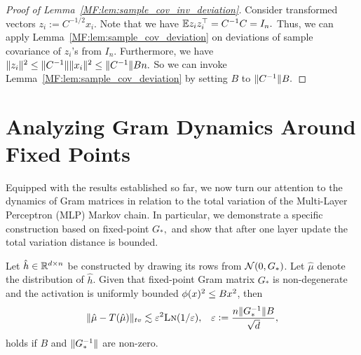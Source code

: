 \begin{proof}[Proof of Lemma~\ref{MF:lem:sample_cov_inv_deviation}]
Consider transformed vectors $z_i:=C^{-1/2} x_i.$ Note that we have $\mathbb{E} z_i z_i^\top = C^{-1} C = I_n.$ Thus, we can apply Lemma~\ref{MF:lem:sample_cov_deviation} on deviations of sample covariance of $z_i$'s from $I_n.$ Furthermore, we have $\lVert z_i\rVert^2 \le \lVert C^{-1}\rVert \lVert x_i\rVert^2 \le \lVert C^{-1}\rVert B n.$ So we can invoke Lemma~\ref{MF:lem:sample_cov_deviation} by setting $B$ to $\lVert C^{-1}\rVert B .$
\end{proof}

\section{Analyzing Gram Dynamics Around Fixed Points}

Equipped  with the results established so far, we now turn our attention to the dynamics of Gram matrices in relation to the total variation of the Multi-Layer Perceptron (MLP) Markov chain. In particular, we demonstrate a specific construction based on fixed-point $G_*,$ and show that after one layer update the total variation distance is bounded.


\begin{lemma}\label{MF:lem:one_step_restated}
    Let $\hat h\in\mathbb{R}^{d\times n}$ be constructed by drawing its rows \iid from $\mathcal{N}(0,G_*)$. Let $\hat\mu$ denote the distribution of $\hat h$. Given that fixed-point Gram matrix $G_*$ is non-degenerate and the activation is uniformly bounded $\phi(x)^2 \le B x^2$, then
    \begin{align}
        \lVert\hat\mu - T(\hat \mu)\rVert_{tv} \lesssim {\varepsilon}^2 \text{\sc{Ln}}(1/{\varepsilon}), && {\varepsilon}:=\frac{n\lVert G_*^{-1}\rVert{B} }{\sqrt{d}},
    \end{align}
    holds if $B$ and $\lVert G_*^{-1}\rVert$ are non-zero. 
\end{lemma}


